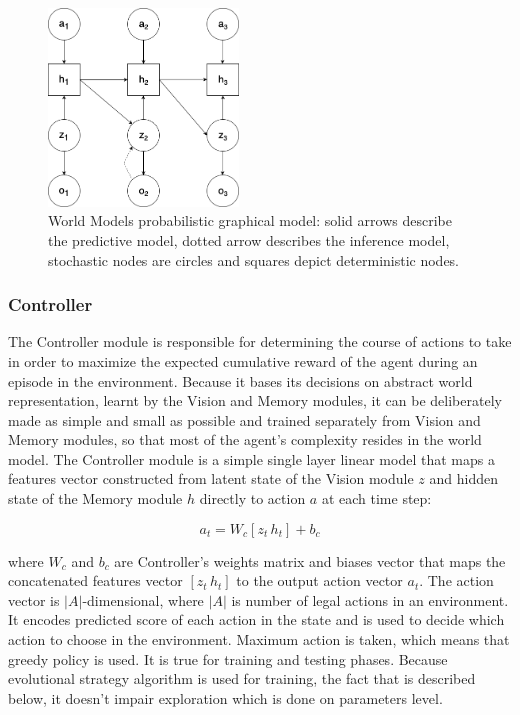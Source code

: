 \begin{figure}[H]
\includegraphics[width=0.45\textwidth,keepaspectratio]{figures/WorldModels/prob_graph_model.png}
\caption[World Models probabilistic graphical model]{World Models probabilistic graphical model: solid arrows describe the predictive model, dotted arrow describes the inference model, stochastic nodes are circles and squares depict deterministic nodes.}
\label{Fig.WorldModelsPGM}
\end{figure}

\subsubsection{Controller}

The Controller module is responsible for determining the course of actions to take in order to maximize the expected cumulative reward of the agent during an episode in the environment. Because it bases its decisions on abstract world representation, learnt by the Vision and Memory modules, it can be deliberately made as simple and small as possible and trained separately from Vision and Memory modules, so that most of the agent’s complexity resides in the world model. The Controller module is a simple single layer linear model that maps a features vector constructed from latent state of the Vision module $z$ and hidden state of the Memory module $h$ directly to action $a$ at each time step:

$$a_t = W_c[z_t\,h_t] + b_c$$

where $W_c$ and $b_c$ are Controller's weights matrix and biases vector that maps the concatenated features vector $[z_t\,h_t]$ to the output action vector $a_t$. The action vector is $|A|$-dimensional, where $|A|$ is number of legal actions in an environment. It encodes predicted score of each action in the state and is used to decide which action to choose in the environment. Maximum action is taken, which means that greedy policy is used. It is true for training and testing phases. Because evolutional strategy algorithm is used for training, the fact that is described below, it doesn't impair exploration which is done on parameters level.

